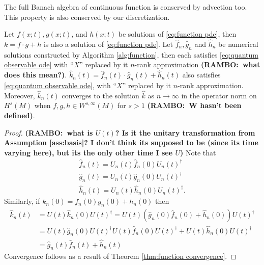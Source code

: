 \documentclass[final,leqno]{siamltex1213}
\newcommand{\ram}[1]{{\normalsize{\textbf{({\color{red}RAMBO:\ }#1)}}}}
\begin{document}
The full Banach algebra of continuous function is conserved by advection too.
This property is also conserved by our discretization.
\begin{theorem} \label{thm:algebra}
	Let $f(x;t),g(x;t)$, and $h(x;t)$ be solutions of \eqref{eq:function pde}, then $k= f \cdot g + h $ is also a solution of \eqref{eq:function pde}.
	Let $\hat{f}_{n}, \hat{g}_{n}$ and $\hat{h}_{n}$ be numerical solutions constructed by Algorithm \ref{alg:function}, then each satisfies \eqref{eq:quantum observable ode} with ``$X$'' replaced by it $n$-rank approximation \ram{what does this mean?}.
	$\hat{k}_{n}(t) = \hat{f}_{n}(t) \cdot \hat{g}_{n}(t) + \hat{h}_{n}(t)$ also satisfies \eqref{eq:quantum observable ode}, with ``$X$'' replaced by it $n$-rank approximation.
	Moreover, $\hat{k}_{n}(t)$ converges to the solution $\hat{k}$ as $n \to \infty$ in the operator norm on $H^{s}(M)$ when $f,g,h \in W^{s,\infty}(M)$ for $s>1$ \ram{W hasn't been defined}.
\end{theorem}
\begin{proof}
\ram{what is $U(t)$? Is it the unitary transformation from Assumption \ref{ass:basis}? I don't think its supposed to be (since its time varying here), but its the only other time I see $U$}
	Note that 
	\begin{align}
		\hat{f}_{n}(t) = U_{n}(t) \hat{f}_{n}(0) U_{n}(t)^{\dagger} \\
		\hat{g}_{n}(t) = U_{n}(t) \hat{g}_{n}(0) U_{n}(t)^{\dagger} \\
		\hat{h}_{n}(t) = U_{n}(t) \hat{h}_{n}(0) U_{n}(t)^{\dagger}.
	\end{align}
	Similarly, if $k_{n}(0) = f_{n}(0) g_{n}(0) + h_{n}(0)$ then
	\begin{align}
		\hat{k}_{n}(t) &= U(t) \hat{k}_{n}(0) U(t)^{\dagger} = U(t)\left( \hat{g}_{n}(0) \hat{f}_{n}(0) + \hat{h}_{n}(0) \right) U(t)^{\dagger} \\
			&= U(t) \hat{g}_{n}(0) U(t)^{\dagger} U(t) \hat{f}_{n}(0) U(t)^{\dagger} + U(t) \hat{h}_{n}(0) U(t)^{\dagger} \\
			&= \hat{g}_{n}(t) \hat{f}_{n}(t) + \hat{h}_{n}(t)
	\end{align}
	Convergence follows as a result of Theorem \ref{thm:function convergence}.
\end{proof}
\end{document}
